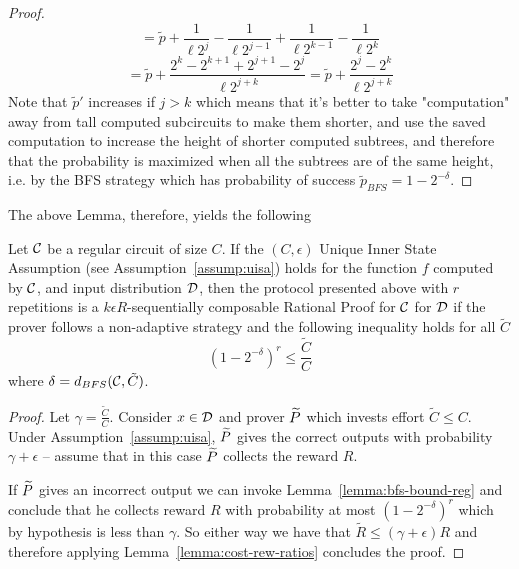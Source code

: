 \begin{proof}
$$ = \tilde{p} + \frac{1}{\ell 2^j} - \frac{1}{\ell 2^{j-1}} + \frac{1}{\ell 2^{k-1}} - \frac{1}{\ell 2^k} $$
$$ = \tilde{p} +\frac{2^k-2^{k+1}+2^{j+1}-2^j}{\ell 2^{j+k}}
= \tilde{p} + \frac{2^j - 2^k}{\ell 2^{j+k}} $$
Note that $\tilde{p}'$ increases if $j > k$ which means that it's better to take "computation" away from tall computed subcircuits to make them shorter, and use the saved computation to increase the height of shorter computed subtrees, and therefore that the probability is maximized when all the subtrees are of the same height, i.e. by the BFS strategy which has probability of success $ \tilde{p}_{BFS} = 1 - 2^{-\delta}$.
\end{proof}

The above Lemma, therefore, yields the following 

\begin{theorem}
\label{thm:reg-circ}
Let $\cal{C}$ be a regular circuit of size $C$. If the $(C,\epsilon)$ Unique Inner State Assumption (see Assumption~\ref{assump:uisa}) holds for the function $f$ computed by $\cal C$, and input distribution $\cal D$, then the protocol presented above with $r$ repetitions is a $k\epsilon R$-sequentially composable Rational Proof for $\cal{C}$ for $\cal D$ if the prover follows a non-adaptive strategy and the following inequality holds for all $\tilde{C}$ 
	$$ (1-2^{-\delta})^r \leq \frac{\tilde{C}}{C} $$
where $\delta=d_{BFS}({\cal C},\tilde{C})$.
\end{theorem}

\begin{proof}
	Let $\gamma=\frac{\tilde{C}}{C}$. 
Consider $x \in \cal D$ and prover $\widetilde{P}$ which invests effort $\tilde{C}\leq C$. Under Assumption~\ref{assump:uisa}, $\widetilde{P}$ gives the correct outputs
with probability $\gamma+\epsilon$ -- assume that in this case $\widetilde{P}$ collects the reward $R$. 

If $\widetilde{P}$ gives an incorrect output we can invoke Lemma~\ref{lemma:bfs-bound-reg} and conclude that he collects reward  
$R$ with probability at most $(1-2^{-\delta})^r$ which by hypothesis is less than $\gamma$. So either way we have that $\tilde{R} \leq (\gamma + \epsilon)R$ 
and therefore applying Lemma~\ref{lemma:cost-rew-ratios} concludes the proof.
\end{proof}